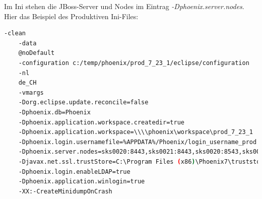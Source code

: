 \begin{flushleft}
\end{flushleft}
\begin{flushleft}
    Im Ini stehen die \Gls{JBoss}-Server und Nodes im Eintrag \textit{-Dphoenix.server.nodes}.
    Hier das Beispiel des Produktiven Ini-Files:
    \lstset{style=gra_codestyle}
    \begin{lstlisting}[language=sh, caption=Workstation.ini PROD Beispiel,captionpos=b,label={lst:workstation.ini-prod-beispiel},breaklines=true]
    -clean
    -data
    @noDefault
    -configuration c:/temp/phoenix/prod_7_23_1/eclipse/configuration
    -nl
    de_CH
    -vmargs
    -Dorg.eclipse.update.reconcile=false
    -Dphoenix.db=Phoenix
    -Dphoenix.application.workspace.createdir=true
    -Dphoenix.application.workspace=\\\\phoenix\workspace\prod_7_23_1
    -Dphoenix.login.usernamefile=%APPDATA%/Phoenix/login_username_prod
    -Dphoenix.server.nodes=sks0020:8443,sks0021:8443,sks0020:8543,sks0021:8543
    -Djavax.net.ssl.trustStore=C:\Program Files (x86)\Phoenix7\truststore.jks
    -Dphoenix.login.enableLDAP=true
    -Dphoenix.application.winlogin=true
    -XX:-CreateMinidumpOnCrash
    \end{lstlisting}
\end{flushleft}
